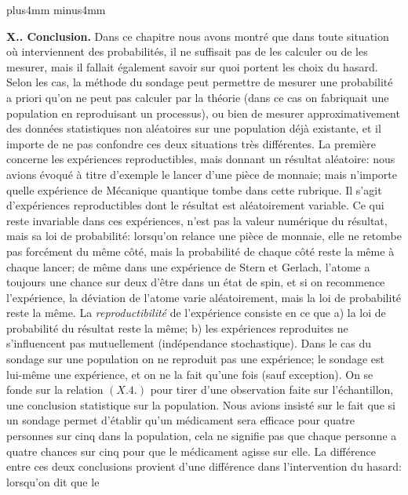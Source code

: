 \vskip8mm plus4mm minus4mm 
 
{\bf X.. Conclusion.} 
\medskip 
Dans ce chapitre nous avons montr\'e que dans toute situation o\`u 
inter\-viennent des probabilit\'es,  il ne suffisait pas de les calculer ou
de les mesurer,  mais il fallait \'egalement savoir sur quoi portent les 
choix du hasard.  Selon les cas,  la m\'ethode du sondage peut permettre 
de mesurer une probabilit\'e a priori qu'on ne peut pas calculer par la 
th\'eorie (dans ce cas on fabriquait une population en reproduisant un 
processus), ou bien de mesurer approximativement des donn\'ees 
statistiques non al\'eatoires sur une population d\'ej\`a existante, 
et il importe de ne pas confondre ces deux situations tr\`es
diff\'erentes. La premi\`ere concerne les exp\'eriences reproductibles, 
mais donnant un r\'esultat al\'eatoire:  nous avions \'evoqu\'e \`a titre 
d'exemple le lancer d'une pi\`ece de monnaie;  mais n'importe quelle 
exp\'erience de M\'ecanique quantique tombe dans cette rubrique. 
Il s'agit d'exp\'eriences reproductibles dont le r\'esultat est 
al\'eatoirement variable.  Ce qui reste invariable dans ces exp\'eriences, 
n'est pas la valeur num\'erique du r\'esultat,  mais sa loi de probabilit\'e: 
lorsqu'on relance une pi\`ece de monnaie,  elle ne retombe pas 
forc\'ement du m\^eme c\^ot\'e,  mais la probabilit\'e de chaque c\^ot\'e 
reste la m\^eme \`a chaque lancer; de m\^eme dans une exp\'erience de 
Stern et Gerlach, l'atome a toujours une chance sur deux d'\^etre 
dans un \'etat de spin, et si on recommence l'exp\'erience,  la d\'eviation 
de l'atome varie al\'eatoirement, mais la loi de probabilit\'e reste la 
m\^eme. La {\it reproductibilit\'e} de l'exp\'erience consiste en ce que
\smallskip
a) la loi de probabilit\'e du 
r\'esultat reste la m\^eme; 
\smallskip 
b) les exp\'eriences reproduites ne s'influencent pas mutuellement 
(in\-d\'e\-pen\-dance sto\-chas\-tique). 
\medskip 
Dans le cas du sondage sur une population on ne reproduit pas une 
exp\'erience; le sondage est lui-m\^eme une exp\'erience,  et on ne la
fait qu'une fois (sauf exception).  On se fonde sur la relation $(X.4.)$ 
pour tirer d'une observation faite sur l'\'echantillon,  une conclusion 
statistique sur la popu\-lation.  Nous avions insist\'e sur le fait que si un 
sondage permet d'\'etablir qu'un m\'edicament sera efficace pour quatre 
personnes sur cinq dans la popu\-lation, cela ne signifie pas que chaque 
personne a quatre chances sur cinq pour que le m\'edicament agisse sur 
elle.  La diff\'erence entre ces deux conclusions provient d'une 
diff\'erence dans l'intervention du hasard: lorsqu'on dit que le 
